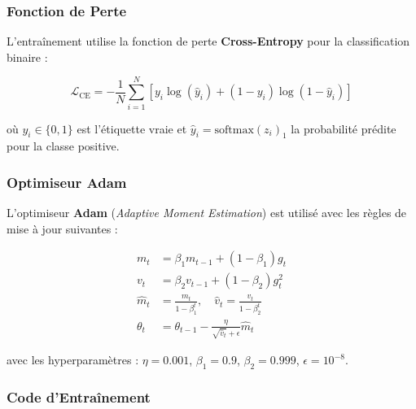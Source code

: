 \documentclass[12pt,a4paper,twoside]{report}
\newcommand{\keyword}[1]{\textbf{\textcolor{stellantisblue}{#1}}}
\begin{document}
\subsubsection{Fonction de Perte}

L'entraînement utilise la fonction de perte \keyword{Cross-Entropy} pour la classification binaire :

\begin{equation}
\mathcal{L}_{\text{CE}} = -\frac{1}{N} \sum_{i=1}^{N} \left[ y_i \log(\hat{y}_i) + (1 - y_i) \log(1 - \hat{y}_i) \right]
\label{eq:cross_entropy}
\end{equation}

où $y_i \in \{0, 1\}$ est l'étiquette vraie et $\hat{y}_i = \text{softmax}(z_i)_1$ la probabilité prédite pour la classe positive.

\subsubsection{Optimiseur Adam}

L'optimiseur \keyword{Adam} (\textit{Adaptive Moment Estimation}) est utilisé avec les règles de mise à jour suivantes :

\begin{align}
m_t &= \beta_1 m_{t-1} + (1 - \beta_1) g_t \label{eq:adam_m} \\
v_t &= \beta_2 v_{t-1} + (1 - \beta_2) g_t^2 \label{eq:adam_v} \\
\hat{m}_t &= \frac{m_t}{1 - \beta_1^t}, \quad \hat{v}_t = \frac{v_t}{1 - \beta_2^t} \label{eq:adam_bias} \\
\theta_t &= \theta_{t-1} - \frac{\eta}{\sqrt{\hat{v}_t} + \epsilon} \hat{m}_t \label{eq:adam_update}
\end{align}

avec les hyperparamètres : $\eta = 0.001$, $\beta_1 = 0.9$, $\beta_2 = 0.999$, $\epsilon = 10^{-8}$.

\subsubsection{Code d'Entraînement}
\end{document}
